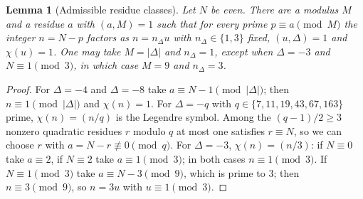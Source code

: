 \documentclass[11pt]{amsart}
\newtheorem{lemma}[theorem]{Lemma}
\theoremstyle{remark}
\begin{document}
\begin{lemma}[Admissible residue classes]\label{lem:admissible}
Let $N$ be even. There are a modulus $M$ and a residue $a$ with $(a,M)=1$ such that for every prime
$p\equiv a\pmod M$ the integer $n=N-p$ factors as $n=n_\Delta u$ with $n_\Delta\in\{1,3\}$ fixed,
$(u,\Delta)=1$ and $\chi(u)=1$. One may take $M=|\Delta|$ and $n_\Delta=1$, except when $\Delta=-3$ and
$N\equiv1\pmod 3$, in which case $M=9$ and $n_\Delta=3$.
\end{lemma}

\begin{proof}
For $\Delta=-4$ and $\Delta=-8$ take $a\equiv N-1\pmod{|\Delta|}$; then $n\equiv1\pmod{|\Delta|}$ and
$\chi(n)=1$. For $\Delta=-q$ with $q\in\{7,11,19,43,67,163\}$ prime, $\chi(n)=(n/q)$ is the Legendre
symbol. Among the $(q-1)/2\ge3$ nonzero quadratic residues $r$ modulo $q$ at most one satisfies $r\equiv N$,
so we can choose $r$ with $a=N-r\not\equiv0\pmod q$. For $\Delta=-3$, $\chi(n)=(n/3)$: if $N\equiv0$ take
$a\equiv2$, if $N\equiv2$ take $a\equiv1\pmod 3$; in both cases $n\equiv1\pmod 3$. If $N\equiv1\pmod 3$ take
$a\equiv N-3\pmod 9$, which is prime to $3$; then $n\equiv3\pmod 9$, so $n=3u$ with $u\equiv1\pmod3$.
\end{proof}
\end{document}
